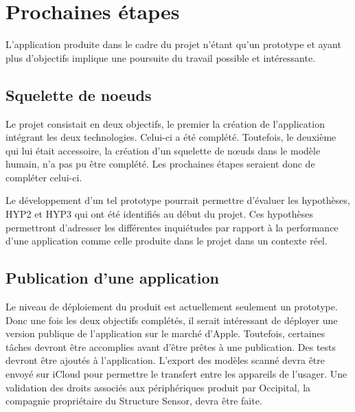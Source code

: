 \documentclass[rapport.tex]{subfiles}
\begin{document}
\section*{Prochaines étapes}
L’application produite dans le cadre du projet n’étant qu’un prototype et ayant plus d’objectifs implique une poursuite du travail possible et intéressante.
\subsection*{Squelette de noeuds}
Le projet consistait en deux objectifs, le premier la création de l’application intégrant les deux technologies. Celui-ci a été complété. Toutefois, le deuxième qui lui était accessoire, la création d’un squelette de nœuds dans le modèle humain, n’a pas pu être complété. Les prochaines étapes seraient donc de compléter celui-ci.
\par
Le développement d’un tel prototype pourrait permettre d’évaluer les hypothèses, HYP2 et HYP3 qui ont été identifiés au début du projet. Ces hypothèses permettront d’adresser les différentes inquiétudes par rapport à la performance d’une application comme celle produite dans le projet dans un contexte réel.
\subsection*{Publication d'une application}
Le niveau de déploiement du produit est actuellement seulement un prototype. Donc une fois les deux objectifs complétés, il serait intéressant de déployer une version publique de l’application sur le marché d’Apple. Toutefois, certaines tâches devront être accomplies avant d’être prêtes à une publication. Des tests devront être ajoutés à l’application. L’export des modèles scanné devra être envoyé sur iCloud pour permettre le transfert entre les appareils de l’usager. Une validation des droits associés aux périphériques produit par Occipital, la compagnie propriétaire du Structure Sensor, devra être faite.
\end{document}
